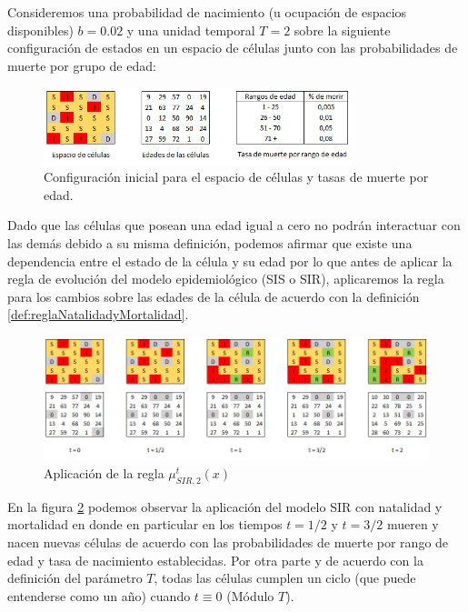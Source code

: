 \begin{example}\label{ex:natalidadyMortalidad}
Consideremos una probabilidad de nacimiento (u ocupación de espacios disponibles) $b=0.02$ y una unidad temporal $T=2$ sobre la siguiente configuración de estados en un espacio de células junto con las probabilidades de muerte por grupo de edad: 

\newpage

\begin{figure}[h]\label{ex:configuraciónInicialNatalidadyMortalidad}
  \centering
    \includegraphics[width=0.8\textwidth]{Imagenes/conInicialMNM.PNG}
    \caption{Configuración inicial para el espacio de células y tasas de muerte por edad.}
\end{figure}

Dado que las células que posean una edad igual a cero no podrán interactuar con las demás debido a su misma definición, podemos afirmar que existe una dependencia entre el estado de la célula y su edad por lo que antes de aplicar la regla de evolución del modelo epidemiológico (SIS o SIR), aplicaremos la regla para los cambios sobre las edades de la célula de acuerdo con la definición \ref{def:reglaNatalidadyMortalidad}.

\begin{figure}[h]\label{ex:aplicaciónReglaNatalidadyMortalidad}
  \centering
    \includegraphics[width=1\textwidth]{Imagenes/natalidadMortalidad.PNG}
    \caption{Aplicación de la regla $\mu_{SIR,2}^t(x)$}
\end{figure}

En la figura \ref{ex:aplicaciónReglaNatalidadyMortalidad} podemos observar la aplicación del modelo SIR con natalidad y mortalidad en donde en particular en los tiempos $t=1/2$ y $t=3/2$ mueren y nacen nuevas células de acuerdo con las probabilidades de muerte por rango de edad y tasa de nacimiento establecidas. Por otra parte y de acuerdo con la definición del parámetro $T$, todas las células cumplen un ciclo (que puede entenderse como un año) cuando $t\equiv0$ (Módulo $T$).
\end{example}


